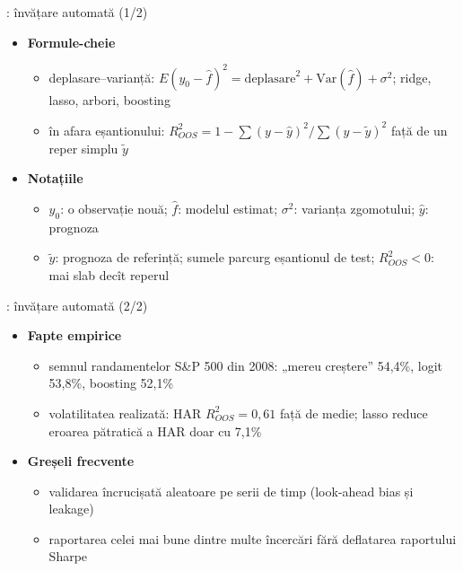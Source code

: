 \begin{frame}{: învățare automată (1/2)}
\itemsize{\small}
\begin{itemize}
    \item \textbf{Formule-cheie}
    \begin{itemize}
        \item deplasare--varianță: $E(y_0 - \hat f)^2 = \text{deplasare}^2 + \mathrm{Var}(\hat f) + \sigma^2$; ridge, lasso, arbori, boosting
        \item în afara eșantionului: $R^2_{OOS} = 1 - \sum(y - \hat y)^2/\sum(y - \tilde y)^2$ față de un reper simplu $\tilde y$ 
    \end{itemize}
    \item \textbf{Notațiile}
    \begin{itemize}
        \item $y_0$: o observație nouă; $\hat f$: modelul estimat; $\sigma^2$: varianța zgomotului; $\hat y$: prognoza
        \item $\tilde y$: prognoza de referință; sumele parcurg eșantionul de test; $R^2_{OOS} < 0$: mai slab decît reperul
    \end{itemize}
\end{itemize}
\end{frame}

\begin{frame}{: învățare automată (2/2)}
\itemsize{\small}
\begin{itemize}
    \item \textbf{Fapte empirice}
    \begin{itemize}
        \item semnul randamentelor S\&P 500 din 2008: „mereu creștere” 54{,}4\%, logit 53{,}8\%, boosting 52{,}1\%
        \item volatilitatea realizată: HAR $R^2_{OOS} = 0{,}61$ față de medie; lasso reduce eroarea pătratică a HAR doar cu 7{,}1\%
    \end{itemize}
    \item \textbf{Greșeli frecvente}
    \begin{itemize}
        \item validarea încrucișată aleatoare pe serii de timp (look-ahead bias și leakage)
        \item raportarea celei mai bune dintre multe încercări fără deflatarea raportului Sharpe
    \end{itemize}
\end{itemize}
\end{frame}

